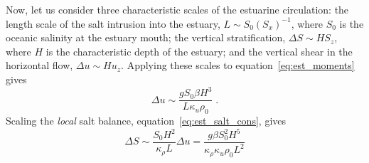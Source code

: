 \documentclass[11pt]{report}
\numberwithin{equation}{section}
\begin{document}
Now, let us consider three characteristic scales of the estuarine circulation: the length scale of the salt intrusion into the estuary, $L \sim S_0 (S_x)^{-1}$, where $S_0$ is the oceanic salinity at the estuary mouth; the vertical stratification, $\Delta S \sim H S_z$, where $H$ is the characteristic depth of the estuary; and the vertical shear in the horizontal flow, $\Delta u \sim H u_z$.  Applying these scales to equation~\ref{eq:est_moments} gives
\begin{equation}
    \Delta u \sim \frac{g S_0 \beta H^3}{L \kappa_u \rho_0} \; .
    \label{eq:est_deltau}
\end{equation}
Scaling the \emph{local} salt balance, equation~\ref{eq:est_salt_cons}, gives
\begin{equation}
    \Delta S \sim \frac{S_0 H^2}{\kappa_\rho L} \Delta u 
             = \frac{g \beta S_0^2 H^5}{\kappa_{\rho} \kappa_u \rho_0 L^2}
    \label{eq:est_deltas}
\end{equation}
\end{document}
